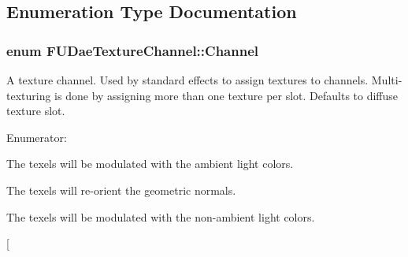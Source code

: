 \subsection{Enumeration Type Documentation}
\hypertarget{namespaceFUDaeTextureChannel_a816e9776262dffc532a4a8d94deadb35}{
\subsubsection[{Channel}]{\setlength{\rightskip}{0pt plus 5cm}enum {\bf FUDaeTextureChannel::Channel}}}
\label{namespaceFUDaeTextureChannel_a816e9776262dffc532a4a8d94deadb35}
A texture channel. Used by standard effects to assign textures to channels. Multi-\/texturing is done by assigning more than one texture per slot. Defaults to diffuse texture slot. \begin{Desc}
\item[Enumerator: ]\par
\begin{description}
\item[{\em 
\hypertarget{namespaceFUDaeTextureChannel_a816e9776262dffc532a4a8d94deadb35a5efd5a13eb3a57206c85dda9bba0cf79}{
AMBIENT}
\label{namespaceFUDaeTextureChannel_a816e9776262dffc532a4a8d94deadb35a5efd5a13eb3a57206c85dda9bba0cf79}
}]The texels will be modulated with the ambient light colors. \item[{\em 
\hypertarget{namespaceFUDaeTextureChannel_a816e9776262dffc532a4a8d94deadb35a687b082c6508091c426e40aaf89d2806}{
BUMP}
\label{namespaceFUDaeTextureChannel_a816e9776262dffc532a4a8d94deadb35a687b082c6508091c426e40aaf89d2806}
}]The texels will re-\/orient the geometric normals. \item[{\em 
\hypertarget{namespaceFUDaeTextureChannel_a816e9776262dffc532a4a8d94deadb35ad1b12d009bc098fcaea00b9c7e125539}{
DIFFUSE}
\label{namespaceFUDaeTextureChannel_a816e9776262dffc532a4a8d94deadb35ad1b12d009bc098fcaea00b9c7e125539}
}]The texels will be modulated with the non-\/ambient light colors. \item[{\em 
}
\end{description}
\end{Desc}
